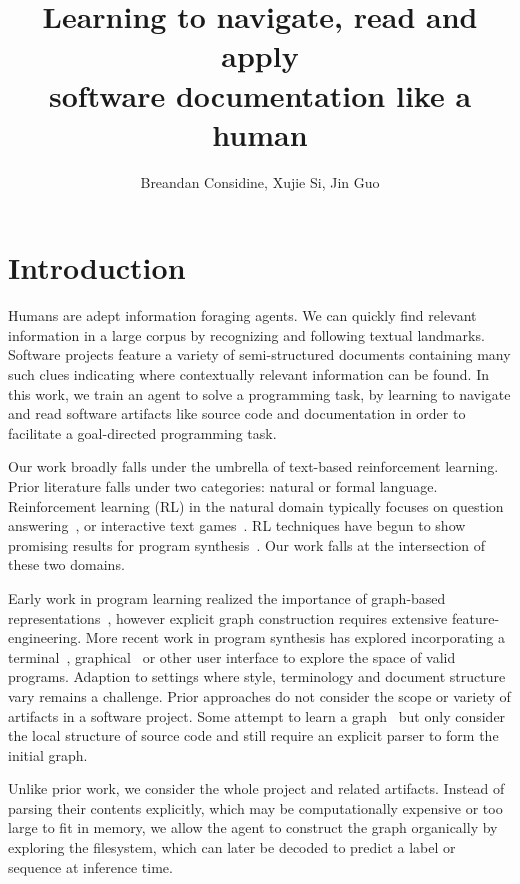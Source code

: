 \documentclass[11pt]{article}
\title{Learning to navigate, read and apply\\software documentation like a human}
\author{Breandan Considine, Xujie Si, Jin Guo}
\begin{document}
\maketitle

\section{Introduction}

Humans are adept information foraging agents. We can quickly find relevant information in a large corpus by recognizing and following textual landmarks. Software projects feature a variety of semi-structured documents containing many such clues indicating where contextually relevant information can be found. In this work, we train an agent to solve a programming task, by learning to navigate and read software artifacts like source code and documentation in order to facilitate a goal-directed programming task.

Our work broadly falls under the umbrella of text-based reinforcement learning. Prior literature falls under two categories: natural or formal language. Reinforcement learning (RL) in the natural domain typically focuses on question answering~\cite{buck2017ask, chen2019reinforcement}, or interactive text games~\cite{he2015deep,ammanabrolu2018playing,narasimhan2015language,guo2020interactive,ammanabrolu2020graph}. RL techniques have begun to show promising results for program synthesis~\cite{ellis2019write, johnson2020learning, chen2020program}. Our work falls at the intersection of these two domains.

Early work in program learning realized the importance of graph-based representations~\cite{allamanis2017learning}, however explicit graph construction requires extensive feature-engineering. More recent work in program synthesis has explored incorporating a terminal~\cite{ellis2019write}, graphical~\cite{walke2020learning} or other user interface to explore the space of valid programs. Adaption to settings where style, terminology and document structure vary remains a challenge. Prior approaches do not consider the scope or variety of artifacts in a software project. Some attempt to learn a graph~\cite{johnson2020learning} but only consider the local structure of source code and still require an explicit parser to form the initial graph.

Unlike prior work, we consider the whole project and related artifacts. Instead of parsing their contents explicitly, which may be computationally expensive or too large to fit in memory, we allow the agent to construct the graph organically by exploring the filesystem, which can later be decoded to predict a label or sequence at inference time.
\end{document}
